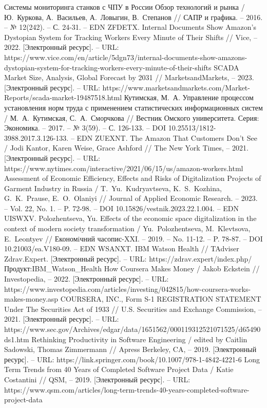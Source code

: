 \documentclass{article}
\begin{document}
\begin{thebibliography}{2}
 Системы мониторинга станков с ЧПУ в России Обзор технологий и рынка / Ю.~Куркова, А.~Васильев, А.~Ловыгин, В.~Степанов // САПР и графика. – 2016. – № 12(242). – С. 24-31. – EDN ZFDETX.
 Internal Documents Show Amazon’s Dystopian System for Tracking Workers Every Minute of Their Shifts // Vice, – 2022. [Электронный ресурс]. – URL: https://www.vice.com/en/article/5dgn73/internal-documents-show-amazons-dystopian-system-for-tracking-workers-every-minute-of-their-shifts
 SCADA Market Size, Analysis, Global Forecast by 2031 // MarketsandMarkets, – 2023. [Электронный ресурс]. – URL: https://www.marketsandmarkets.com/Market-Reports/scada-market-19487518.html
 Кутимская, М.~А. Управление процессом установления норм труда с применением статистических информационных систем / М.~А.~Кутимская, С.~А.~Сморчкова // Вестник Омского университета. Серия: Экономика. – 2017. – № 3(59). – С. 126-133. – DOI 10.25513/1812-3988.2017.3.126-133. – EDN ZUEXNT.
 The Amazon That Customers Don’t See / Jodi Kantor, Karen Weise, Grace Ashford // The New York Times, – 2021. [Электронный ресурс]. – URL: https://www.nytimes.com/interactive/2021/06/15/us/amazon-workers.html
 Assessment of Economic Efficiency, Effects and Risks of Digitalization Projects of Garment Industry in Russia / T.~Yu.~Kudryavtseva, K.~S.~Kozhina, G.~K.~Prause, E.~O.~Olaniyi // Journal of Applied Economic Research. – 2023. – Vol. 22, No. 1. – P. 72-98. – DOI 10.15826/vestnik.2023.22.1.004. – EDN UISWXV.
 Polozhentseva, Yu. Effects of the economic space digitalization in the context of modern society transformation / Yu.~Polozhentseva, M.~Klevtsova, E.~Leontyev // Економiчний часопис-XXI. – 2019. – No. 11-12. – P. 78-87. – DOI 10.21003/ea.V180-09. – EDN WSANXT.
 IBM Watson Health // TAdviser Zdrav.Expert. [Электронный ресурс]. – URL:  https://zdrav.expert/index.php/Продукт:IBM\_Watson\_Health
 How Coursera Makes Money / Jakob Eckstein // Investopedia, – 2022. [Электронный ресурс]. – URL: https://www.investopedia.com/articles/investing/042815/how-coursera-works-makes-money.asp
 COURSERA, INC., Form S-1 REGISTRATION STATEMENT Under The Securities Act of 1933 // U.S. Securities and Exchange Commission, – 2021. [Электронный ресурс]. – URL: https://www.sec.gov/Archives/edgar/data/1651562/000119312521071525/d65490ds1.htm
 Rethinking Productivity in Software Engineering / edited by Caitlin Sadowski, Thomas Zimmermann // Apress Berkeley, CA, – 2019. [Электронный ресурс]. – URL: https://link.springer.com/book/10.1007/978-1-4842-4221-6
 Long Term Trends from 40 Years of Completed Software Project Data / Katie Costantini // QSM, – 2019. [Электронный ресурс]. – URL: https://www.qsm.com/articles/long-term-trends-40-years-completed-software-project-data
\end{thebibliography} 
\end{document}
